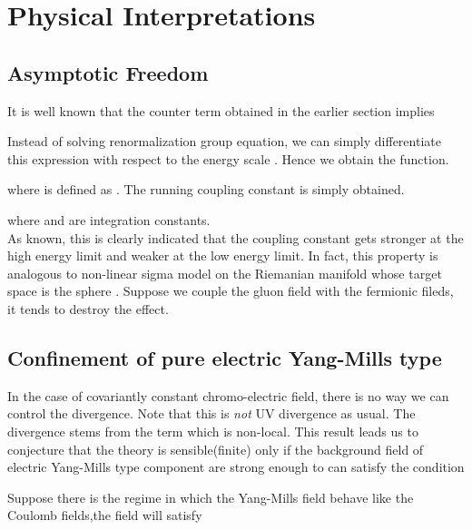 \documentclass[a4paper,12 pt]{article}
\begin{document}
\section{Physical Interpretations}
\subsection{Asymptotic Freedom}
It is well known that the counter term obtained in the earlier
section implies
\begin{center}
\coordHE{}
\end{center}
Instead of solving renormalization group equation, we can simply
differentiate this expression with respect to the energy scale
\myHighlight{$\mu$}\coordHE{}. Hence we obtain the \myHighlight{$\beta$}\coordHE{} function.
\begin{center}
\coordHE{}
\end{center}
where \myHighlight{$ \beta $}\coordHE{} is defined as \coordHE{}. The
running coupling constant is simply obtained.

\begin{center}
\coordHE{}
\end{center}
where \coordHE{} and \coordHE{} are integration constants.
\\ As known, this is clearly indicated that the coupling
constant gets stronger at the high energy limit and weaker at the
low energy limit. In fact, this property is analogous to
non-linear sigma model on the Riemanian manifold whose target
space is the sphere \coordHE{}. Suppose we couple the gluon field
with the fermionic fileds, it tends to destroy the effect.
\subsection{Confinement of pure electric Yang-Mills type}
In the case of covariantly constant chromo-electric field, there
is no way we can control the divergence. Note that this is
\emph{not} UV divergence as usual. The divergence stems from the
\coordHE{} term which is non-local. This result leads us to
conjecture that the theory is sensible(finite) only if the
background field of electric Yang-Mills type component are strong
enough to can satisfy the condition
\begin{center}
\coordHE{}
\end{center}
Suppose there is the regime in which the Yang-Mills field behave
like the Coulomb fields,the field will satisfy
\end{document}
